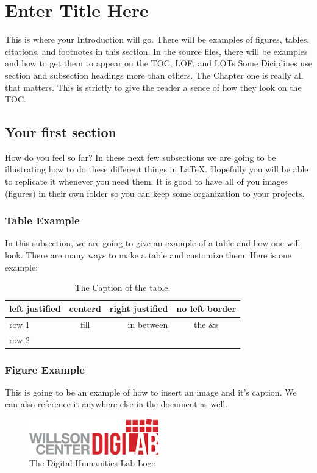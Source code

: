 \documentclass[./dissertation.tex]{subfiles}
\begin{document}
    \chapter{Enter Title Here}
    This is where your Introduction will go. There will be examples of figures, tables, citations, and footnotes in this section. In the source files, there will be examples and how to get them to appear on the TOC, LOF, and LOTs Some Diciplines use section and subsection headings more than others. The Chapter one is really all that matters. This is strictly to give the reader a sence of how they look on the TOC.
    \section{Your first section}
      How do you feel so far? In these next few subsections we are going to be illustrating how to do these different things in LaTeX. Hopefully you will be able to replicate it whenever you need them.
      It is good to have all of you images (figures) in their own folder so you can keep some organization to your projects.

      \subsection{Table Example}
      In this subsection, we are going to give an example of a table and how one will look. There are many ways to make a table and customize them. Here is one example:


      \begin{table}[h]
        \centering
      \begin{tabular}[c]{|l|c|rc|}
        \hline
        left justified  & centerd  & right justified  & no left border\\
        \hline
        row 1 & fill & in between & the \&s\\
        row 2 & & &\\
        \hline


      \end{tabular}
      \caption{The Caption of the table.}
      \label{table:someLabel}
      \end{table}



      \subsection{Figure Example}
      This is going to be an example of how to insert an image and it's caption. We can also reference it anywhere else in the document as well.
      \begin{figure}[h]
        \centering\includegraphics[width=0.5\textwidth]{figures/digilab_logo}
        \caption{The Digital Humanities Lab Logo}
      \end{figure}
\end{document}
